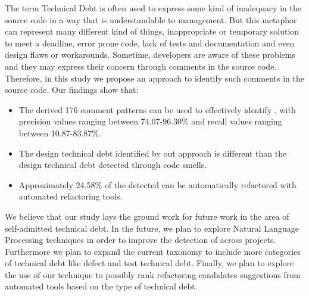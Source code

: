 The term Technical Debt is often used to express some kind of inadequacy in the source code in a way that is understandable to management. But this metaphor can represent many different kind of things, inappropriate or temporary solution to meet a deadline, error prone code, lack of tests and documentation and even design flaws or workarounds. Sometime, developers are aware of these problems and they may express their concern through comments in the source code. Therefore, in this study we propose an approach to identify such comments in the source code. Our findings show that:

\begin{itemize}
\item The derived 176 comment patterns can be used to effectively identify \SADTD, with precision values ranging between 74.07-96.30\% and recall values ranging between 10.87-83.87\%.
\item The design technical debt identified by out approach is different than the design technical debt detected through code smells. 

\item Approximately 24.58\% of the detected \SADTD can be automatically refactored with automated refactoring tools.

\end{itemize} 

We believe that our study lays the ground work for future work in the area of self-admitted technical debt. In the future, we plan to explore Natural Language Processing techniques in order to improve the detection of \SADTD across projects. Furthermore we plan to expand the current taxonomy to include more categories of technical debt like defect and test technical debt. Finally, we plan to explore the use of our technique to possibly rank refactoring candidates suggestions from automated tools based on the type of technical debt. 